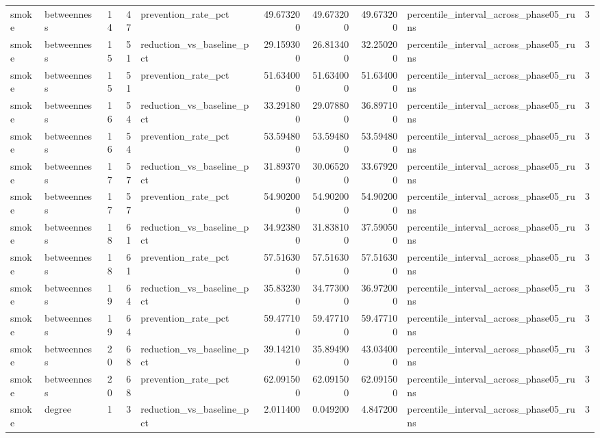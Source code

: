\begin{tabular}{llrrlrrrlr}
smoke & betweenness & 14 & 47 & prevention\_rate\_pct & 49.673200 & 49.673200 & 49.673200 & percentile\_interval\_across\_phase05\_runs & 3 \\
smoke & betweenness & 15 & 51 & reduction\_vs\_baseline\_pct & 29.159300 & 26.813400 & 32.250200 & percentile\_interval\_across\_phase05\_runs & 3 \\
smoke & betweenness & 15 & 51 & prevention\_rate\_pct & 51.634000 & 51.634000 & 51.634000 & percentile\_interval\_across\_phase05\_runs & 3 \\
smoke & betweenness & 16 & 54 & reduction\_vs\_baseline\_pct & 33.291800 & 29.078800 & 36.897100 & percentile\_interval\_across\_phase05\_runs & 3 \\
smoke & betweenness & 16 & 54 & prevention\_rate\_pct & 53.594800 & 53.594800 & 53.594800 & percentile\_interval\_across\_phase05\_runs & 3 \\
smoke & betweenness & 17 & 57 & reduction\_vs\_baseline\_pct & 31.893700 & 30.065200 & 33.679200 & percentile\_interval\_across\_phase05\_runs & 3 \\
smoke & betweenness & 17 & 57 & prevention\_rate\_pct & 54.902000 & 54.902000 & 54.902000 & percentile\_interval\_across\_phase05\_runs & 3 \\
smoke & betweenness & 18 & 61 & reduction\_vs\_baseline\_pct & 34.923800 & 31.838100 & 37.590500 & percentile\_interval\_across\_phase05\_runs & 3 \\
smoke & betweenness & 18 & 61 & prevention\_rate\_pct & 57.516300 & 57.516300 & 57.516300 & percentile\_interval\_across\_phase05\_runs & 3 \\
smoke & betweenness & 19 & 64 & reduction\_vs\_baseline\_pct & 35.832300 & 34.773000 & 36.972000 & percentile\_interval\_across\_phase05\_runs & 3 \\
smoke & betweenness & 19 & 64 & prevention\_rate\_pct & 59.477100 & 59.477100 & 59.477100 & percentile\_interval\_across\_phase05\_runs & 3 \\
smoke & betweenness & 20 & 68 & reduction\_vs\_baseline\_pct & 39.142100 & 35.894900 & 43.034000 & percentile\_interval\_across\_phase05\_runs & 3 \\
smoke & betweenness & 20 & 68 & prevention\_rate\_pct & 62.091500 & 62.091500 & 62.091500 & percentile\_interval\_across\_phase05\_runs & 3 \\
smoke & degree & 1 & 3 & reduction\_vs\_baseline\_pct & 2.011400 & 0.049200 & 4.847200 & percentile\_interval\_across\_phase05\_runs & 3 \\

\end{tabular}
